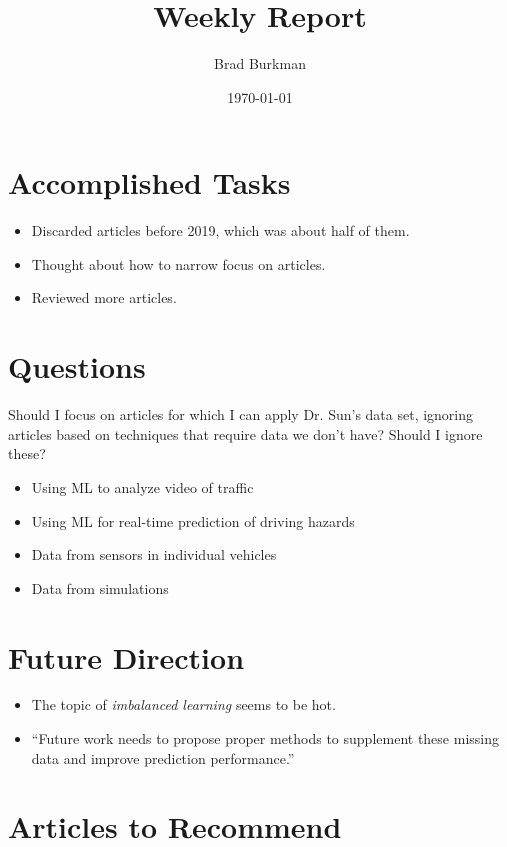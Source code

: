 \documentclass[11pt]{article}
\title{Weekly Report}
\author{Brad Burkman}
\date{\today}
\begin{document}
\setlength{\parindent}{20pt}
\begin{spacing}{1.2}
\maketitle
\tableofcontents


\section{Accomplished Tasks}

\begin{itemize}
	\item Discarded articles before 2019, which was about half of them.
	\item Thought about how to narrow focus on articles.  
	\item Reviewed more articles.
\end{itemize}

\section{Questions}

Should I focus on articles for which I can apply Dr. Sun's data set, ignoring articles based on techniques that require data we don't have?  Should I ignore these?

\begin{itemize}
	\item Using ML to analyze video of traffic
	\item Using ML for real-time prediction of driving hazards
	\item Data from sensors in individual vehicles
	\item Data from simulations
\end{itemize}

\section{Future Direction}

\begin{itemize}
	\item The topic of {\it imbalanced learning} seems to be hot.  
	\item ``Future work needs to propose proper methods to supplement these missing data and improve prediction performance.''
\end{itemize}

\section{Articles to Recommend}


\end{spacing}
\end{document}
